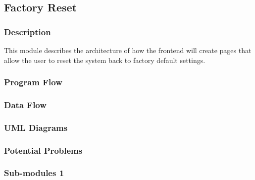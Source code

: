 
\subsection{Factory Reset}

\subsubsection{Description}

This module describes the architecture of how the frontend will create pages that allow the user to reset the system back to factory default settings.

\subsubsection{Program Flow}


\subsubsection{Data Flow}


\subsubsection{UML Diagrams}


\subsubsection{Potential Problems}


\subsubsection{Sub-modules 1}

